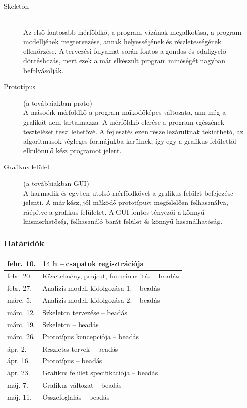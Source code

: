 	\begin{description}
		\item[Skeleton] \hfill \\
			Az első fontosabb mérföldkő, a program vázának megalkotása, a program modelljének megtervezése, annak helyességének és részletességének ellenőrzése. A tervezési folyamat során fontos a gondos és odafigyelő döntéshozás, mert ezek a már elkészült program minőségét nagyban befolyásolják.
		\item[Prototípus] (a továbbiakban proto)\hfill \\
			A második mérföldkő a program működőképes változata, ami még a grafikát nem tartalmazza. A mérföldkő elérése a program egészének tesztelését teszi lehetővé. A fejlesztés ezen része lezárultnak tekinthető, az algoritmusok végleges formájukba kerülnek, így egy a grafikus felülettől elkülönülő kész programot jelent.
		\item[Grafikus felület] (a továbbiakban GUI)\hfill \\
			A harmadik és egyben utolsó mérföldkövet a grafikus felület befejezése jelenti. A már kész, jól működő prototípust megfelelően felhasználva, ráépítve a grafikus felületet. A GUI fontos tényezői a könnyű kiismerhetőség, felhasználó barát felület és könnyű használhatóság.
	\end{description}

    \subsubsection{Határidők}
	\begin{center}
	\begin{tabular}{| l | l | }
		\hline
		febr. 10. & 14 h -- csapatok regisztrációja\\
		\hline
		febr. 20. & Követelmény, projekt, funkcionalitás -- beadás\\
		\hline
		febr. 27. & Analízis modell kidolgozása 1. -- beadás\\
		\hline
		márc. 5. & Analízis modell kidolgozása 2. -- beadás\\
		\hline
		márc. 12. & Szkeleton tervezése -- beadás\\
		\hline
		márc. 19. & Szkeleton -- beadás\\
		\hline
		márc. 26. & Prototípus koncepciója -- beadás\\
		\hline
		ápr. 2. & Részletes tervek -- beadás\\
		\hline
		ápr. 16. & Prototípus -- beadás\\
		\hline
		ápr. 23. & Grafikus felület specifikációja -- beadás\\
		\hline
		máj. 7. & Grafikus változat -- beadás\\
		\hline
		máj. 11. & Összefoglalás -- beadás\\
		\hline
	\end{tabular}
	\end{center}

